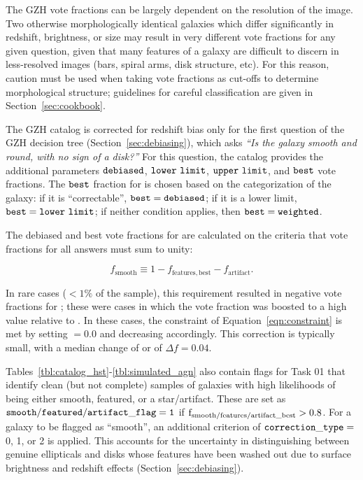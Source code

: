 \documentclass[twocolumn]{aastex6}
\begin{document}
The GZH vote fractions can be largely dependent on the resolution of the image.
Two otherwise morphologically identical galaxies which differ significantly in
redshift, brightness, or size may result in very different vote fractions for
any given question, given that many features of a galaxy are difficult to
discern in less-resolved images (bars, spiral arms, disk structure, etc). For
this reason, caution must be used when taking vote fractions as cut-offs to
determine morphological structure; guidelines for careful classification are
given in Section~\ref{sec:cookbook}. 

The GZH catalog is corrected for redshift bias only for the first
question of the GZH decision tree (Section~\ref{sec:debiasing}), which asks
{\it ``Is the galaxy smooth and round, with no sign of a disk?''} For this
question, the catalog provides the additional parameters $\tt debiased$, $\tt
lower~limit$, $\tt upper~limit$, and $\tt best$ vote fractions. The $\tt best$
fraction for \ffeatures{} is chosen based on the categorization of the galaxy:
if it is ``correctable'', $\tt best = debiased$; if it is a lower limit, $\tt
best = lower~limit$; if neither condition applies, then $\tt best = weighted$.

The debiased and best vote fractions for \fsmooth{} are calculated on the
criteria that vote fractions for all answers must sum to unity:

\begin{equation}
f_\mathrm{smooth} \equiv 1 - f_\mathrm{features,best} - f_\mathrm{artifact}.
\label{eqn:constraint}
\end{equation}

\noindent In rare cases ($<1\%$ of the sample), this requirement resulted in
negative vote fractions for \fsmooth; these were cases in which the
\ffeatures{} vote fraction was boosted to a high value relative to \fartifact.
In these cases, the constraint of Equation~\ref{eqn:constraint} is met by
setting \fsmooth$=0.0$ and decreasing \fbest{} accordingly. This correction is
typically small, with a median change of
\ffeatures{} or \fsmooth{} of $\Delta f = 0.04$.

Tables~\ref{tbl:catalog_hst}-\ref{tbl:simulated_agn} also contain flags for
Task 01 that identify clean (but not complete) samples of galaxies with high
likelihoods of being either smooth, featured, or a star/artifact.  These are
set as $\tt smooth/featured/artifact\_flag=1$ if $\rm
f_{smooth/features/artifact\_best}>0.8$. For a galaxy to be flagged as
``smooth'', an additional criterion of $\tt correction\_type =~$0, 1, or 2 is
applied. This accounts for the uncertainty in distinguishing between genuine
ellipticals and disks whose features have been washed out due to surface
brightness and redshift effects (Section~\ref{sec:debiasing}).
\end{document}
